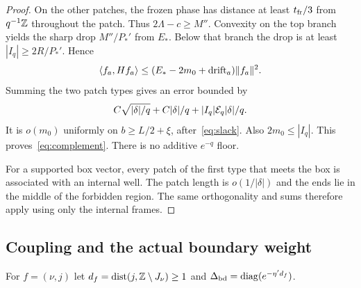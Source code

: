 \begin{proof}
On the other patches, the frozen phase has distance at least $t_{\rm fr}/3$ from $q^{-1}\mathbb Z$ throughout the patch. Thus $2\Lambda-c\ge M''$. Convexity on the top branch yields the sharp drop $M''/P_*'$ from $E_*$. Below that branch the drop is at least $|I_q|\ge2R/P_*'$. Hence
\[
 \langle f_a,Hf_a\rangle\le(E_*-2m_0+\mathrm{drift}_a)\lVert f_a\rVert^2.
\]
Summing the two patch types gives an error bounded by
\[
 C\sqrt{|\delta|/q}+C|\delta|/q
       +|I_q|\mathcal E_q|\delta|/q.
\]
It is $o(m_0)$ uniformly on $b\ge L/2+\xi$, after~\eqref{eq:slack}. Also $2m_0\le|I_q|$. This proves~\eqref{eq:complement}. There is no additive $e^{-q}$ floor.

For a supported box vector, every patch of the first type that meets the box is associated with an internal well. The patch length is $o(1/|\delta|)$ and the ends lie in the middle of the forbidden region. The same orthogonality and sums therefore apply using only the internal frames.
\end{proof}

\subsection{Coupling and the actual boundary weight}
For $f=(\nu,j)$ let $d_f=\operatorname{dist}(j,\mathbb Z\setminus J_\nu)\ge1$ and
$\Delta_{\rm bd}=\operatorname{diag}(e^{-\eta'd_f})$.

